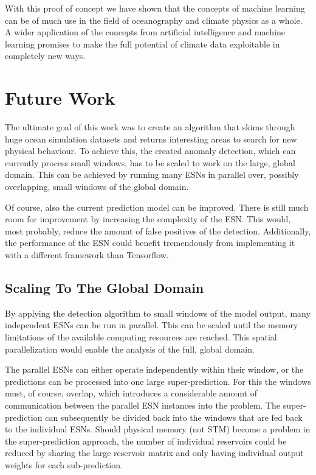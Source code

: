 With this proof of concept we have shown that the concepts of machine learning
can be of much use in the field of oceanography and climate physics as a whole.
A wider application of the concepts from artificial intelligence and machine
learning promises to make the full potential of climate data exploitable in
completely new ways.



\section{Future Work}%
\label{sec:future_work}

The ultimate goal of this work was to create an algorithm that skims through
huge ocean simulation datasets and returns interesting areas to search for new
physical behaviour. To achieve this, the created anomaly detection, which
can currently process small windows, has to be scaled to work on the large,
global domain. This can be achieved by running many ESNs in parallel over,
possibly overlapping, small windows of the global domain.

Of course, also the current  prediction model can be improved. There is still
much room for improvement by increasing the complexity of the ESN. This would,
most probably, reduce the amount of false positives of the detection.
Additionally, the performance of the ESN could benefit tremendously from
implementing it with a different framework than Tensorflow.

\subsection{Scaling To The Global Domain}%
\label{sub:scaling_to_the_global_domain}

By applying the detection algorithm to small windows of the model output, many
independent ESNs can be run in parallel. This can be scaled until the memory
limitations of the available computing resources are reached.
This spatial parallelization would enable the analysis of the full, global domain.

The parallel ESNs can either operate independently within their window, or the
predictions can be processed into one large super-prediction. For this the
windows must, of course, overlap, which introduces a considerable amount of
communication between the parallel ESN instances into the problem. The
super-prediction can subsequently be divided back into the windows that are fed
back to the individual ESNs. Should physical memory (not STM) become a problem in
the super-prediction approach, the number of individual reservoirs could be
reduced by sharing the large reservoir matrix and only having individual output
weights for each sub-prediction.

